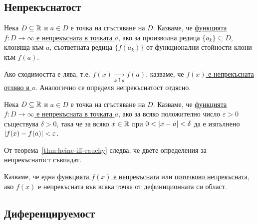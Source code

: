 \documentclass[numbers=endperiod, DIV=15, bibliography=totocnumbered]{scrartcl}
\begin{document}
\subsection{Непрекъснатост}

\begin{definition}
  Нека $D \subseteq \mathbb{R}$ и $a \in D$ е точка на сгъстяване на $D$. Казваме, че \uline{функцията $f: D \to \infty$ е непрекъсната в точката $a$}, ако за произволна редица $\{ a_k \} \subseteq D$, клоняща към $a$, съответната редица $\{ f(a_k) \}$ от функционални стойности клони към $f(a)$.

  Ако сходимостта е лява, т.е. $f(x) \underset {k \uparrow a} \longrightarrow f(a)$, казваме, че \uline{$f(x)$ е непрекъсната отляво в $a$}. Аналогично се определя непрекъснатост отдясно.
\end{definition}

\begin{definition}
  Нека $D \subseteq \mathbb{R}$ и $a \in D$ е точка на сгъстяване на $D$. Казваме, че \uline{функцията $f: D \to \infty$ е непрекъсната в точката $a$}, ако за всяко положително число $\varepsilon > 0$ съществува $\delta > 0$, така че за всяко $x \in \mathbb{R}$ при $0 < \left\vert x - a \right\vert < \delta$ да е изпълнено $\left\vert f(x) - f(a) \right\vert < \varepsilon$.
\end{definition}

\begin{note}
  От теорема~\ref{thm:heine-iff-cauchy} следва, че двете определения за непрекъснатост съвпадат.
\end{note}

\begin{definition}
  Казваме, че една \uline{функцията $f(x)$ е непрекъсната} или \uline{поточково непрекъсната}, ако $f(x)$ е непрекъсната във всяка точка от дефиниционната си област.
\end{definition}

\subsection{Диференцируемост}
\end{document}
